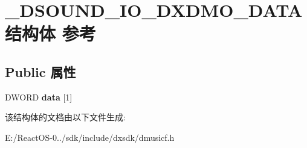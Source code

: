 \hypertarget{struct___d_s_o_u_n_d___i_o___d_x_d_m_o___d_a_t_a}{}\section{\+\_\+\+D\+S\+O\+U\+N\+D\+\_\+\+I\+O\+\_\+\+D\+X\+D\+M\+O\+\_\+\+D\+A\+T\+A结构体 参考}
\label{struct___d_s_o_u_n_d___i_o___d_x_d_m_o___d_a_t_a}
\subsection*{Public 属性}
\begin{DoxyCompactItemize}
\item 
\mbox{\label{struct___d_s_o_u_n_d___i_o___d_x_d_m_o___d_a_t_a_afc6f9a4a9141102a1311582343293051}} 
D\+W\+O\+RD {\bfseries data} \mbox{[}1\mbox{]}
\end{DoxyCompactItemize}


该结构体的文档由以下文件生成\+:\begin{DoxyCompactItemize}
\item 
E\+:/\+React\+O\+S-\/0../sdk/include/dxsdk/dmusicf.\+h\end{DoxyCompactItemize}
